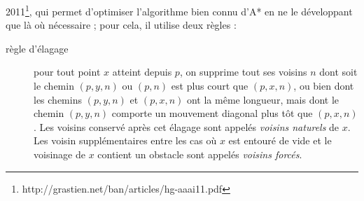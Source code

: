 \documentclass[a4paper,10pt]{article}
\begin{document}
2011\footnote{http://grastien.net/ban/articles/hg-aaai11.pdf}, qui permet d'optimiser l'algorithme bien connu d'A* en ne le 
développant que là où nécessaire ; pour cela, il utilise deux règles :
\begin{description}
\item[règle d'élagage] pour tout point $x$ atteint depuis $p$, on supprime tout ses voisins $n$ dont soit le chemin $(p,y,n)$
ou $(p,n)$ est plus court que $(p,x,n)$, ou bien dont les chemins $(p,y,n)$ et $(p,x,n)$ ont la même longueur, mais dont le
chemin $(p,y,n)$ comporte un mouvement diagonal plus tôt que $(p,x,n)$. Les voisins conservé après cet élagage sont appelés 
\emph{voisins naturels} de $x$. Les voisin supplémentaires entre les cas où $x$ est entouré de vide et le voisinage de $x$ 
contient un obstacle sont appelés \emph{voisins forcés}.


\end{description}
\end{document}
